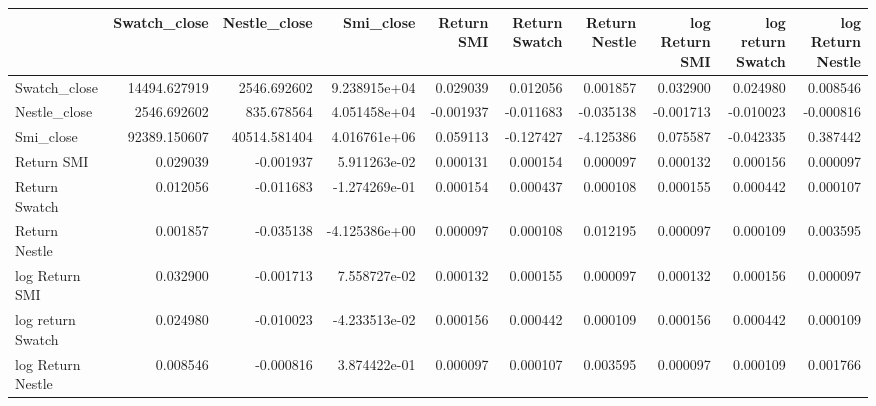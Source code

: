 \begin{tabular}{lrrrrrrrrr}
\toprule
{} &  Swatch\_close &  Nestle\_close &     Smi\_close &  Return SMI &  Return Swatch &  Return Nestle &  log Return SMI &  log return Swatch &  log Return Nestle \\
\midrule
Swatch\_close      &  14494.627919 &   2546.692602 &  9.238915e+04 &    0.029039 &       0.012056 &       0.001857 &        0.032900 &           0.024980 &           0.008546 \\
Nestle\_close      &   2546.692602 &    835.678564 &  4.051458e+04 &   -0.001937 &      -0.011683 &      -0.035138 &       -0.001713 &          -0.010023 &          -0.000816 \\
Smi\_close         &  92389.150607 &  40514.581404 &  4.016761e+06 &    0.059113 &      -0.127427 &      -4.125386 &        0.075587 &          -0.042335 &           0.387442 \\
Return SMI        &      0.029039 &     -0.001937 &  5.911263e-02 &    0.000131 &       0.000154 &       0.000097 &        0.000132 &           0.000156 &           0.000097 \\
Return Swatch     &      0.012056 &     -0.011683 & -1.274269e-01 &    0.000154 &       0.000437 &       0.000108 &        0.000155 &           0.000442 &           0.000107 \\
Return Nestle     &      0.001857 &     -0.035138 & -4.125386e+00 &    0.000097 &       0.000108 &       0.012195 &        0.000097 &           0.000109 &           0.003595 \\
log Return SMI    &      0.032900 &     -0.001713 &  7.558727e-02 &    0.000132 &       0.000155 &       0.000097 &        0.000132 &           0.000156 &           0.000097 \\
log return Swatch &      0.024980 &     -0.010023 & -4.233513e-02 &    0.000156 &       0.000442 &       0.000109 &        0.000156 &           0.000442 &           0.000109 \\
log Return Nestle &      0.008546 &     -0.000816 &  3.874422e-01 &    0.000097 &       0.000107 &       0.003595 &        0.000097 &           0.000109 &           0.001766 \\
\bottomrule
\end{tabular}
